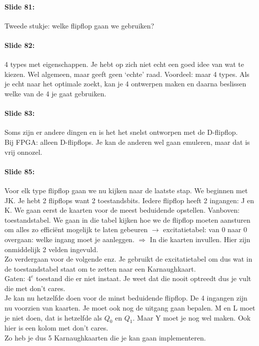 \documentclass[10pt,a4paper]{book}
\begin{document}
\paragraph{Slide 81:} Tweede stukje: welke flipflop gaan we gebruiken?

\paragraph{Slide 82:} 4 types met eigenschappen.
Je hebt op zich niet echt een goed idee van wat te kiezen. Wel algemeen, maar geeft geen `echte' raad. Voordeel: maar 4 types. Als je echt naar het optimale zoekt, kan je 4 ontwerpen maken en daarna beslissen welke van de 4 je gaat gebruiken.

\paragraph{Slide 83:} Soms zijn er andere dingen en is het het snelst ontworpen met de D-flipflop.\\
Bij FPGA: alleen D-flipflops. Je kan de anderen wel gaan emuleren, maar dat is vrij onnozel.

\paragraph{Slide 85:} Voor elk type flipflop gaan we nu kijken naar de laatste stap. We beginnen met JK. Je hebt 2 flipflops want 2 toestandsbits. Iedere flipflop heeft 2 ingangen: J en K. We gaan eerst de kaarten voor de meest beduidende opstellen. Vanboven: toestandstabel. We gaan in die tabel kijken hoe we de flipflop moeten aansturen om alles zo effici\"ent mogelijk te laten gebeuren $\rightarrow$ excitatietabel: van 0 naar 0 overgaan: welke ingang moet je aanleggen. $\Rightarrow$ In die kaarten invullen. Hier zijn onmiddelijk 2 velden ingevuld.\\
Zo verdergaan voor de volgende enz. Je gebruikt de excitatietabel om dus wat in de toestandstabel staat om te zetten naar een Karnaughkaart.\\
Gaten: $4^e$ toestand die er niet instaat. Je weet dat die nooit optreedt dus je vult die met don't cares.\\
Je kan nu hetzelfde doen voor de minst beduidende flipflop. De 4 ingangen zijn nu voorzien van kaarten. Je moet ook nog de uitgang gaan bepalen. M en L moet je niet doen, dat is hetzelfde als $Q_0$ en $Q_1$. Maar Y moet je nog wel maken. Ook hier is een kolom met don't cares.\\
Zo heb je dus 5 Karnaughkaarten die je kan gaan implementeren.
\end{document}
